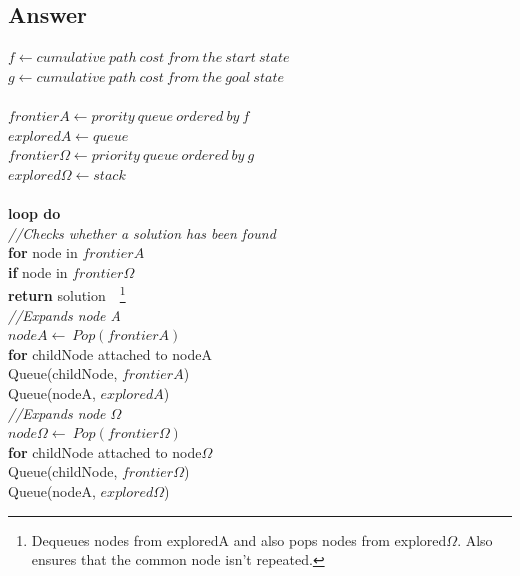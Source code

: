 \documentclass{article}
\begin{document}
\subsection{Answer}
$f \leftarrow cumulative\ path\ cost\ from\ the\ start\ state$ \\
$g \leftarrow cumulative\ path\ cost\ from\ the\ goal\ state$
\\~\\
$frontierA \leftarrow prority\ queue\ ordered\ by\ f$ \\
$exploredA \leftarrow queue$ \\
$frontier\Omega \leftarrow priority\ queue\ ordered\ by\ g$ \\
$explored\Omega \leftarrow stack$
\\~\\
\textbf{loop do}\\
\-\hspace{10mm} \textit{//Checks whether a solution has been found} \\
\-\hspace{10mm} \textbf{for} node in $frontierA$ \\
\-\hspace{20mm} \textbf{if} node in $frontier\Omega$ \\
\-\hspace{30mm} \textbf{return} solution\ \ \footnote{Dequeues nodes from exploredA and also pops nodes from explored$\Omega$. Also ensures that the common node isn't repeated.} \\ 
\-\hspace{10mm} \textit{//Expands node A} \\
\-\hspace{10mm} $nodeA \leftarrow \ Pop(frontierA)$ \\
\-\hspace{10mm} \textbf{for} childNode attached to nodeA \\
\-\hspace{20mm} Queue(childNode, $frontierA$) \\
\-\hspace{10mm} Queue(nodeA, $exploredA$) \\
\-\hspace{10mm} \textit{//Expands node $\Omega$} \\
\-\hspace{10mm} $node\Omega \leftarrow \ Pop(frontier\Omega)$ \\
\-\hspace{10mm} \textbf{for} childNode attached to node$\Omega$ \\
\-\hspace{20mm} Queue(childNode, $frontier\Omega$) \\
\-\hspace{10mm} Queue(nodeA, $explored\Omega$) \\
\end{document}
